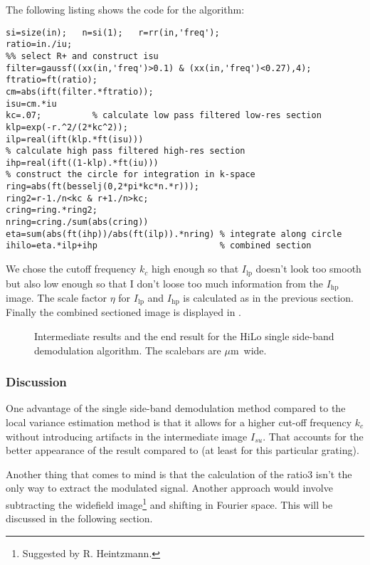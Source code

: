 The following listing shows the code for the algorithm:
\begin{lstlisting}
si=size(in);   n=si(1);   r=rr(in,'freq');
ratio=in./iu;
%% select R+ and construct isu
filter=gaussf((xx(in,'freq')>0.1) & (xx(in,'freq')<0.27),4);
ftratio=ft(ratio);
cm=abs(ift(filter.*ftratio));
isu=cm.*iu
kc=.07;          % calculate low pass filtered low-res section
klp=exp(-r.^2/(2*kc^2));
ilp=real(ift(klp.*ft(isu)))
% calculate high pass filtered high-res section
ihp=real(ift((1-klp).*ft(iu)))
% construct the circle for integration in k-space
ring=abs(ft(besselj(0,2*pi*kc*n.*r)));
ring2=r-1./n<kc & r+1./n>kc;
cring=ring.*ring2;
nring=cring./sum(abs(cring))
eta=sum(abs(ft(ihp))/abs(ft(ilp)).*nring) % integrate along circle
ihilo=eta.*ilp+ihp                        % combined section
\end{lstlisting}
We chose the cutoff frequency $k_c$ high enough so that
$I_\textrm{lp}$ doesn't look too smooth but also low enough so that I
don't loose too much information from the $I_\textrm{hp}$ image. The
scale factor $\eta$ for $I_\textrm{lp}$ and $I_\textrm{hp}$ is
calculated as in the previous section. Finally the combined sectioned
image is displayed in .
\begin{figure}[htb]
  \centering
  \caption{Intermediate results and the end result for the HiLo single
    side-band demodulation algorithm. The scalebars are
    \unit[2]{$\mu$m} wide.}
  \label{fig:hilo2_2}
\end{figure}
\subsubsection*{Discussion}
One advantage of the single side-band demodulation method compared to
the local variance estimation method is that it allows for a higher
cut-off frequency $k_c$ without introducing artifacts in the
intermediate image $I_{su}$. That accounts for the better appearance
of the result  compared to  (at
least for this particular grating).

Another thing that comes to mind is that the calculation of the ratio3
isn't the only way to extract the modulated signal. Another approach
would involve subtracting the widefield image\footnote{Suggested by
  R. Heintzmann.} and shifting in Fourier space. This will be
discussed in the following section.
